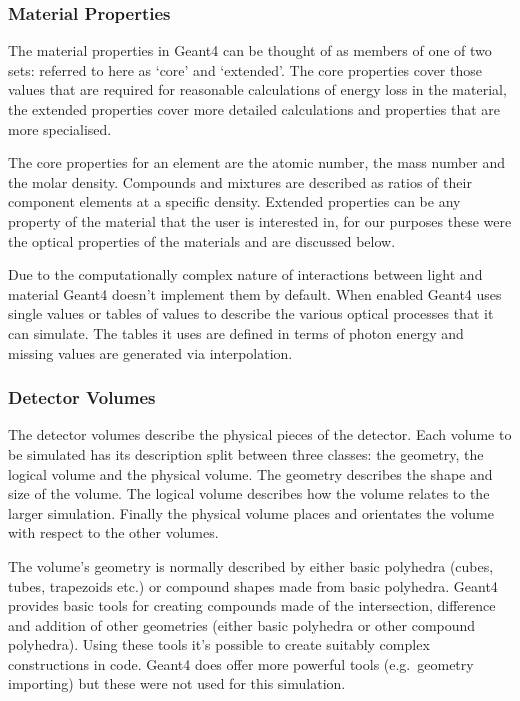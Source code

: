 \subsubsection{Material Properties} %
\label{ssub:material_properties}

The material properties in Geant4 can be thought of as members of one of two sets: referred to here as `core' and `extended'. The core properties cover those values that are required for reasonable calculations of energy loss in the material, the extended properties cover more detailed calculations and properties that are more specialised.

The core properties for an element are the atomic number, the mass number and the molar density. Compounds and mixtures are described as ratios of their component elements at a specific density. Extended properties can be any property of the material that the user is interested in, for our purposes these were the optical properties of the materials and are discussed below.

Due to the computationally complex nature of interactions between light and material Geant4 doesn't implement them by default. When enabled Geant4 uses single values or tables of values to describe the various optical processes that it can simulate. The tables it uses are defined in terms of photon energy and missing values are generated via interpolation. 

\subsubsection{Detector Volumes} %
\label{ssub:detector_volumes}

The detector volumes describe the physical pieces of the detector. Each volume to be simulated has its description split between three classes: the geometry, the logical volume and the physical volume. The geometry describes the shape and size of the volume. The logical volume describes how the volume relates to the larger simulation. Finally the physical volume places and orientates the volume with respect to the other volumes.

The volume's geometry is normally described by either basic polyhedra (cubes, tubes, trapezoids etc.) or compound shapes made from basic polyhedra. Geant4 provides basic tools for creating compounds made of the intersection, difference and addition of other geometries (either basic polyhedra or other compound polyhedra). Using these tools it's possible to create suitably complex constructions in code. Geant4 does offer more powerful tools (e.g.\ geometry importing) but these were not used for this simulation.

